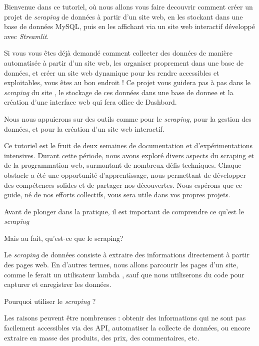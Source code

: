 \documentclass[small]{zmdocument}
\begin{document}
\maketitle
\tableofcontents

\begin{LevelOneIntroduction}

Bienvenue dans ce tutoriel, où nous allons vous faire decouvrir comment créer un projet  de \textit{scraping} de données à partir d'un site web, en les stockant dans une base de données MySQL, puis en les affichant via un site web interactif développé avec \textit{Streamlit}.

Si vous vous êtes déjà demandé comment collecter des données de manière automatisée à partir d'un site web, les organiser proprement dans une base de données, et créer un site web dynamique pour les rendre accessibles et exploitables, vous êtes au bon endroit ! Ce projet vous guidera pas à pas dans le \textit{scraping} du site , le stockage de ces données dans une base de donnee   et la création d'une interface web qui fera office de Dashbord.

Nous nous appuierons sur des outils  comme  pour le \textit{scraping},  pour la gestion des données, et  pour la création d'un site web interactif. 

Ce tutoriel est le fruit de deux semaines de documentation et d'expérimentations intensives. Durant cette période, nous avons exploré divers aspects du scraping et de la programmation web, surmontant de nombreux défis techniques. Chaque obstacle a été une opportunité d'apprentissage, nous permettant de développer des compétences solides et de partager nos découvertes. Nous espérons que ce guide, né de nos efforts collectifs, vous sera utile dans vos propres projets.

\end{LevelOneIntroduction}

Avant de plonger dans la pratique, il est important de comprendre ce qu'est le \textit{scraping}
\begin{Question}
Mais au fait, qu'est-ce que le scraping?
\end{Question}

Le \textit{scraping} de données consiste à extraire des informations directement à partir des pages web. En d'autres termes, nous allons parcourir les pages d'un site, comme le ferait un utilisateur lambda , sauf que nous utiliserons du code pour capturer et enregistrer les données.
\begin{Question}
Pourquoi utiliser le \textit{scraping} ?
\end{Question}
 Les raisons peuvent être nombreuses : obtenir des informations qui ne sont pas facilement accessibles via des API, automatiser la collecte de données, ou encore extraire en masse des produits, des prix, des commentaires, etc.
\end{document}
